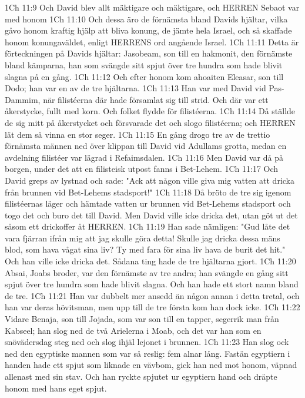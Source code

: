 1Ch 11:9  Och David blev allt mäktigare och mäktigare, och HERREN Sebaot var med honom
1Ch 11:10  Och dessa äro de förnämsta bland Davids hjältar, vilka gåvo honom kraftig hjälp att bliva konung, de jämte hela Israel, och så skaffade honom konungaväldet, enligt HERRENS ord angående Israel.
1Ch 11:11  Detta är förteckningen på Davids hjältar: Jasobeam, son till en hakmonit, den förnämste bland kämparna, han som svängde sitt spjut över tre hundra som hade blivit slagna på en gång.
1Ch 11:12  Och efter honom kom ahoaiten Eleasar, son till Dodo; han var en av de tre hjältarna.
1Ch 11:13  Han var med David vid Pas-Dammim, när filistéerna där hade församlat sig till strid. Och där var ett åkerstycke, fullt med korn. Och folket flydde för filistéerna.
1Ch 11:14  Då ställde de sig mitt på åkerstycket och försvarade det och slogo filistéerna; och HERREN lät dem så vinna en stor seger.
1Ch 11:15  En gång drogo tre av de trettio förnämsta männen ned över klippan till David vid Adullams grotta, medan en avdelning filistéer var lägrad i Refaimsdalen.
1Ch 11:16  Men David var då på borgen, under det att en filisteisk utpost fanns i Bet-Lehem.
1Ch 11:17  Och David greps av lystnad och sade: "Ack att någon ville giva mig vatten att dricka från brunnen vid Bet-Lehems stadsport!"
1Ch 11:18  Då bröto de tre sig igenom filistéernas läger och hämtade vatten ur brunnen vid Bet-Lehems stadsport och togo det och buro det till David. Men David ville icke dricka det, utan göt ut det såsom ett drickoffer åt HERREN.
1Ch 11:19  Han sade nämligen: "Gud låte det vara fjärran ifrån mig att jag skulle göra detta! Skulle jag dricka dessa mäns blod, som hava vågat sina liv? Ty med fara för sina liv hava de burit det hit." Och han ville icke dricka det. Sådana ting hade de tre hjältarna gjort.
1Ch 11:20  Absai, Joabs broder, var den förnämste av tre andra; han svängde en gång sitt spjut över tre hundra som hade blivit slagna. Och han hade ett stort namn bland de tre.
1Ch 11:21  Han var dubbelt mer ansedd än någon annan i detta tretal, och han var deras hövitsman, men upp till de tre första kom han dock icke.
1Ch 11:22  Vidare Benaja, son till Jojada, som var son till en tapper, segerrik man från Kabseel; han slog ned de två Arielerna i Moab, och det var han som en snövädersdag steg ned och slog ihjäl lejonet i brunnen.
1Ch 11:23  Han slog ock ned den egyptiske mannen som var så reslig: fem alnar lång. Fastän egyptiern i handen hade ett spjut som liknade en vävbom, gick han ned mot honom, väpnad allenast med sin stav. Och han ryckte spjutet ur egyptiern hand och dräpte honom med hans eget spjut.
